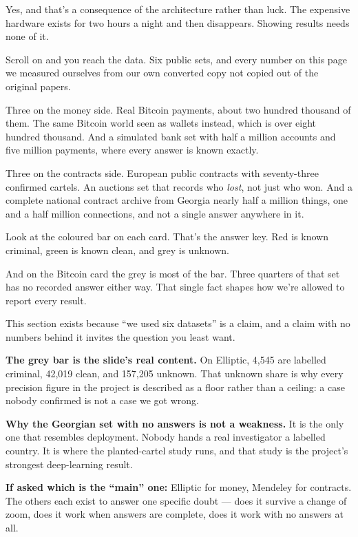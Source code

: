 \documentclass[11pt]{article}
\begin{document}
\begin{asked}
 Yes, and that's a consequence of the
architecture rather than luck. The expensive hardware exists for two hours a
night and then disappears. Showing results needs none of it.
\end{asked}



\begin{saythis}
Scroll on and you reach the data. Six public sets, and every number on this page
we measured ourselves from our own converted copy \bt not copied out of the
original papers.

Three on the money side. Real Bitcoin payments, about two hundred thousand of
them. The same Bitcoin world seen as wallets instead, which is over eight
hundred thousand. And a simulated bank set with half a million accounts and
five million payments, where every answer is known exactly.

Three on the contracts side. European public contracts with seventy-three
confirmed cartels. An auctions set that records who \emph{lost}, not just who
won. And a complete national contract archive from Georgia \bt nearly half a
million things, one and a half million connections, and not a single answer
anywhere in it.

Look at the coloured bar on each card. That's the answer key. Red is known
criminal, green is known clean, and grey is unknown.

And on the Bitcoin card the grey is most of the bar. Three quarters of that set
has no recorded answer either way. That single fact shapes how we're allowed to
report every result.
\end{saythis}

\begin{means}
This section exists because ``we used six datasets'' is a claim, and a claim
with no numbers behind it invites the question you least want.

\textbf{The grey bar is the slide's real content.} On Elliptic, 4,545 are
labelled criminal, 42,019 clean, and 157,205 unknown. That unknown share is why
every precision figure in the project is described as a floor rather than a
ceiling: a case nobody confirmed is not a case we got wrong.

\textbf{Why the Georgian set with no answers is not a weakness.} It is the only
one that resembles deployment. Nobody hands a real investigator a labelled
country. It is where the planted-cartel study runs, and that study is the
project's strongest deep-learning result.

\textbf{If asked which is the ``main'' one:} Elliptic for money, Mendeley for
contracts. The others each exist to answer one specific doubt --- does it survive
a change of zoom, does it work when answers are complete, does it work with no
answers at all.
\end{means}
\end{document}
